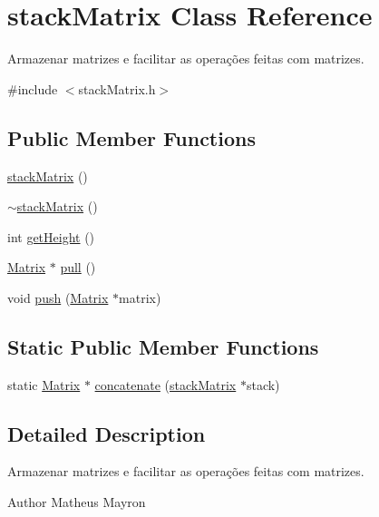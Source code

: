 \hypertarget{classstack_matrix}{\section{stack\-Matrix Class Reference}
\label{classstack_matrix}
}


Armazenar matrizes e facilitar as operações feitas com matrizes.  




{\ttfamily \#include $<$stack\-Matrix.\-h$>$}

\subsection*{Public Member Functions}
\begin{DoxyCompactItemize}
\item 
\hyperlink{classstack_matrix_a18c788dcd55012fe00da47efd0ffb92e}{stack\-Matrix} ()
\item 
\hyperlink{classstack_matrix_a0bbdaa5e69a1b844267f66e87962ab97}{$\sim$stack\-Matrix} ()
\item 
int \hyperlink{classstack_matrix_a39783ed954314dc305d106c4cd31ee80}{get\-Height} ()
\item 
\hyperlink{class_matrix}{Matrix} $\ast$ \hyperlink{classstack_matrix_ad2eea64980b6a16dbe84a4605ee0359c}{pull} ()
\item 
void \hyperlink{classstack_matrix_af46ba624157a0536c295f2b1810e5277}{push} (\hyperlink{class_matrix}{Matrix} $\ast$matrix)
\end{DoxyCompactItemize}
\subsection*{Static Public Member Functions}
\begin{DoxyCompactItemize}
\item 
static \hyperlink{class_matrix}{Matrix} $\ast$ \hyperlink{classstack_matrix_ad957510a9d1490b62291e11d482b2b80}{concatenate} (\hyperlink{classstack_matrix}{stack\-Matrix} $\ast$stack)
\end{DoxyCompactItemize}


\subsection{Detailed Description}
Armazenar matrizes e facilitar as operações feitas com matrizes. 

\begin{DoxyAuthor}{Author}
Matheus Mayron 
\end{DoxyAuthor}


